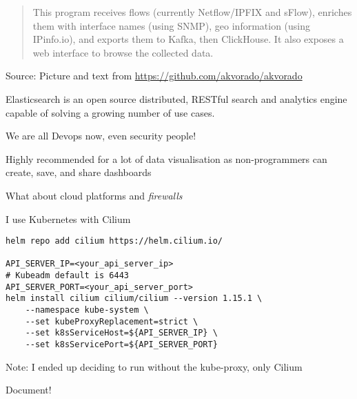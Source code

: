 \documentclass[Screen16to9,17pt]{foils}
\begin{document}

\begin{quote}
This program receives flows (currently Netflow/IPFIX and sFlow), enriches them with interface names (using SNMP), geo information (using IPinfo.io), and exports them to Kafka, then ClickHouse. It also exposes a web interface to browse the collected data.
\end{quote}
Source: Picture and text from \url{https://github.com/akvorado/akvorado}




Elasticsearch is an open source distributed, RESTful search and analytics engine capable of solving a growing number of use cases.


\centerline{We are all Devops now, even security people!}

Highly recommended for a lot of data visualisation as non-programmers can create, save, and share dashboards



What about cloud platforms and \emph{firewalls}

I use Kubernetes with Cilium

\begin{verbatim}
helm repo add cilium https://helm.cilium.io/

API_SERVER_IP=<your_api_server_ip>
# Kubeadm default is 6443
API_SERVER_PORT=<your_api_server_port>
helm install cilium cilium/cilium --version 1.15.1 \
    --namespace kube-system \
    --set kubeProxyReplacement=strict \
    --set k8sServiceHost=${API_SERVER_IP} \
    --set k8sServicePort=${API_SERVER_PORT}
\end{verbatim}

\begin{list2}
\item Note: I ended up deciding to run without the kube-proxy, only Cilium
\item Document!
\end{list2}



\end{document}
